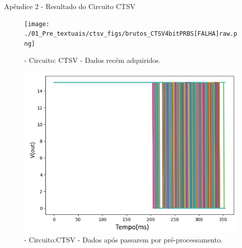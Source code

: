     
    
    
    \newpage
    Apêndice 2 - Resultado do Circuito CTSV
    
    \begin{figure}[H]
        \begin{center}
        \texttt{[image: ./01\_Pre\_textuais/ctsv\_figs/brutos\_CTSV4bitPRBS[FALHA]raw.png]}
        \caption{\label{fig:dadoBrutoPAA}- Circuito: CTSV - Dados recém adquiridos.}
        \end{center}
        \end{figure}
        
        \begin{figure}[H]
        \begin{center}
        \includegraphics[width=13cm]{./01_Pre_textuais/ctsv_figs/dadosPreProc_CTSV_mc_+_4bitPRBS_[FALHA]raw.png}
        \caption{\label{fig:dadoPAA}- Circuito:CTSV - Dados após passarem por pré-processamento.}
        \end{center}
        \end{figure}
        
